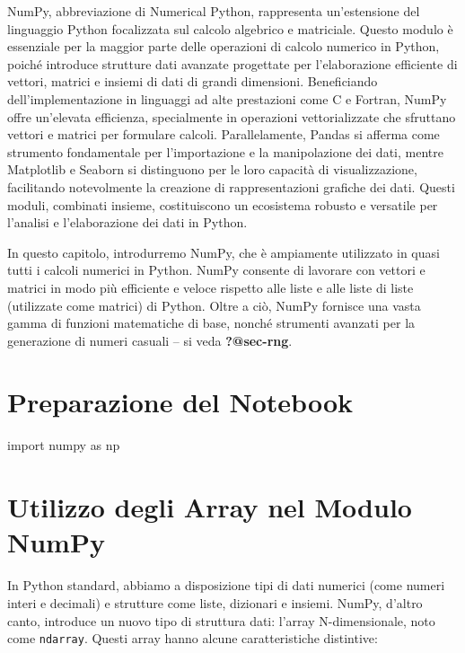 \documentclass[
  letterpaper,
  krantz2]{{[}./krantz{]}}
\newenvironment{Shaded}{\begin{snugshade}}{\end{snugshade}}
\newcommand{\ImportTok}[1]{\textcolor[rgb]{0.00,0.46,0.62}{#1}}
\newcommand{\NormalTok}[1]{\textcolor[rgb]{0.00,0.23,0.31}{#1}}
\begin{document}
NumPy, abbreviazione di Numerical Python, rappresenta un'estensione del
linguaggio Python focalizzata sul calcolo algebrico e matriciale. Questo
modulo è essenziale per la maggior parte delle operazioni di calcolo
numerico in Python, poiché introduce strutture dati avanzate progettate
per l'elaborazione efficiente di vettori, matrici e insiemi di dati di
grandi dimensioni. Beneficiando dell'implementazione in linguaggi ad
alte prestazioni come C e Fortran, NumPy offre un'elevata efficienza,
specialmente in operazioni vettorializzate che sfruttano vettori e
matrici per formulare calcoli. Parallelamente, Pandas si afferma come
strumento fondamentale per l'importazione e la manipolazione dei dati,
mentre Matplotlib e Seaborn si distinguono per le loro capacità di
visualizzazione, facilitando notevolmente la creazione di
rappresentazioni grafiche dei dati. Questi moduli, combinati insieme,
costituiscono un ecosistema robusto e versatile per l'analisi e
l'elaborazione dei dati in Python.

In questo capitolo, introdurremo NumPy, che è ampiamente utilizzato in
quasi tutti i calcoli numerici in Python. NumPy consente di lavorare con
vettori e matrici in modo più efficiente e veloce rispetto alle liste e
alle liste di liste (utilizzate come matrici) di Python. Oltre a ciò,
NumPy fornisce una vasta gamma di funzioni matematiche di base, nonché
strumenti avanzati per la generazione di numeri casuali -- si veda
\textbf{?@sec-rng}.

\section{Preparazione del Notebook}\label{preparazione-del-notebook}

\begin{Shaded}
\begin{Highlighting}[]
\ImportTok{import}\NormalTok{ numpy }\ImportTok{as}\NormalTok{ np}
\end{Highlighting}
\end{Shaded}

\section{Utilizzo degli Array nel Modulo
NumPy}\label{utilizzo-degli-array-nel-modulo-numpy}

In Python standard, abbiamo a disposizione tipi di dati numerici (come
numeri interi e decimali) e strutture come liste, dizionari e insiemi.
NumPy, d'altro canto, introduce un nuovo tipo di struttura dati: l'array
N-dimensionale, noto come \texttt{ndarray}. Questi array hanno alcune
caratteristiche distintive:
\end{document}
